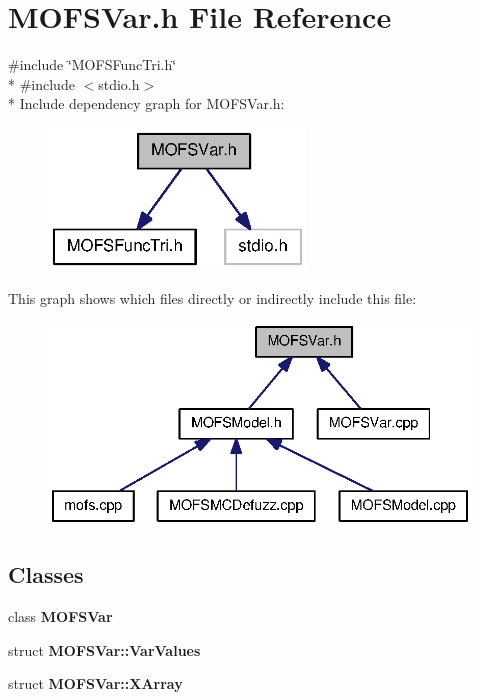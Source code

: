 \section{M\-O\-F\-S\-Var.\-h File Reference}
\label{MOFSVar_8h}
{\ttfamily \#include \char`\"{}M\-O\-F\-S\-Func\-Tri.\-h\char`\"{}}\\*
{\ttfamily \#include $<$stdio.\-h$>$}\\*
Include dependency graph for M\-O\-F\-S\-Var.\-h\-:\nopagebreak
\begin{figure}[H]
\begin{center}
\leavevmode
\includegraphics[width=194pt]{MOFSVar_8h__incl}
\end{center}
\end{figure}
This graph shows which files directly or indirectly include this file\-:\nopagebreak
\begin{figure}[H]
\begin{center}
\leavevmode
\includegraphics[width=336pt]{MOFSVar_8h__dep__incl}
\end{center}
\end{figure}
\subsection*{Classes}
\begin{DoxyCompactItemize}
\item 
class {\bf M\-O\-F\-S\-Var}
\item 
struct {\bf M\-O\-F\-S\-Var\-::\-Var\-Values}
\item 
struct {\bf M\-O\-F\-S\-Var\-::\-X\-Array}
\end{DoxyCompactItemize}
